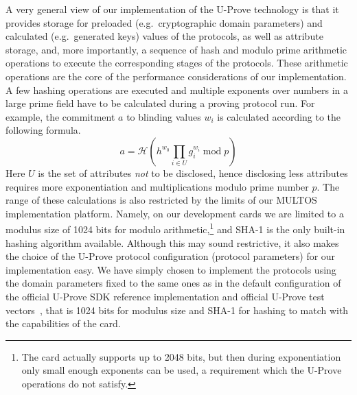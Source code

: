 A very general view of our implementation of the U-Prove technology is
that it provides storage for preloaded (e.g.\ cryptographic domain
parameters) and calculated (e.g.\ generated keys) values of the
protocols, as well as attribute storage, and, more importantly, a
sequence of hash and modulo prime arithmetic operations to execute the
corresponding stages of the protocols. These arithmetic operations are
the core of the performance considerations of our implementation. A few
hashing operations are executed and multiple exponents over numbers in
a large prime field have to be calculated during a proving
protocol run. For example, the commitment $a$ to blinding values $w_i$
is calculated according to the following formula.
\begin{equation}\label{eqn:a}
  a = \mathcal{H}(h^{w_0} \prod_{i \in U} g_i^{w_i} \mathop{\mathrm{mod}}
p)
\end{equation}
Here $U$ is the set of attributes \emph{not} to be disclosed, hence
disclosing less attributes requires more exponentiation and
multiplications modulo prime number $p$. The range of these calculations
is also restricted by the limits of our MULTOS implementation platform.
Namely, on our
development cards we are limited to a modulus size of 1024 bits for
modulo arithmetic,\footnote{The card actually supports up to 2048
  bits, but then during exponentiation only small enough exponents can
  be used, a requirement which the U-Prove operations do not satisfy.}
and SHA-1 is the only built-in hashing algorithm available. Although
this may sound restrictive, it also makes the choice of the U-Prove
protocol configuration (protocol parameters) for our implementation
easy. We have simply chosen to implement the protocols using the
domain parameters fixed to the same ones as in the default
configuration of the official U-Prove SDK reference implementation and
official U-Prove test vectors~\cite{U-Prove_Vectors2011}, that is 1024
bits for modulus size and SHA-1 for hashing to match with the
capabilities of the card.

